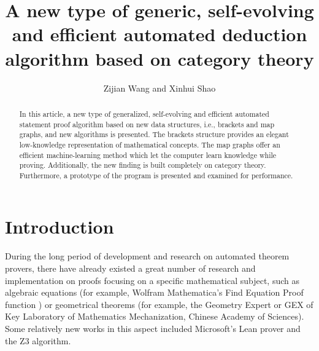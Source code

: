 \documentclass{aims}
\numberwithin{equation}{section}
\numberwithin{theorem}{section}	%
\numberwithin{axiom}{section}	%
\numberwithin{definition}{section}	%
\begin{document}
	\title{A new type of generic, self-evolving and efficient automated deduction algorithm based on category theory}
	\author{%
		Zijian Wang
		and Xinhui Shao
	}
	\address{%
	}

	\begin{abstract}
	In this article, a new type of generalized, self-evolving and efficient automated statement proof algorithm based on new data structures, i.e., brackets and map graphs,
	and new algorithms is presented. The brackets structure provides an elegant low-knowledge representation of mathematical concepts. The map graphs offer an efficient machine-learning method which let the computer learn knowledge while proving. Additionally, the new finding is  built completely on category theory. Furthermore, a prototype of the program is presented and examined for performance.
	\end{abstract}


	\maketitle
	
	\section{Introduction}
	During the long period of development and research on automated theorem provers, there have already existed a great number of research and implementation on proofs focusing on a specific mathematical subject, such as algebraic equations (for example, Wolfram Mathematica{'}s Find Equation Proof function \cite{Wolfram2019}) or geometrical theorems (for example, the Geometry Expert or GEX \cite{Gao1998} of Key Laboratory of Mathematics Mechanization, Chinese Academy of Sciences). Some relatively new works in this aspect included Microsoft{'}s Lean prover \cite{Moura2021} and the Z3 \cite{Moura2008} algorithm.
	
\end{document}

